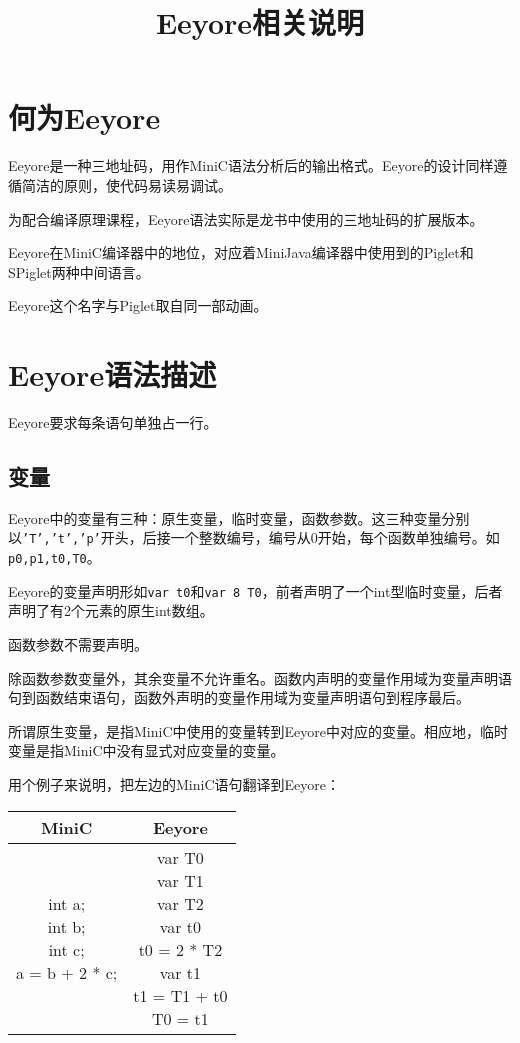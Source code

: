 \documentclass{ctexart}
\title{Eeyore相关说明}
\date{}
\author{}
\newenvironment{typewriterfont}{\ttfamily}{\par}
\begin{document}
\maketitle

\section{何为Eeyore}
Eeyore是一种三地址码，用作MiniC语法分析后的输出格式。Eeyore的设计同样遵循简洁的原则，使代码易读易调试。

为配合编译原理课程，Eeyore语法实际是龙书中使用的三地址码的扩展版本。

Eeyore在MiniC编译器中的地位，对应着MiniJava编译器中使用到的Piglet和SPiglet两种中间语言。

Eeyore这个名字与Piglet取自同一部动画。

\section{Eeyore语法描述}
Eeyore要求每条语句单独占一行。
\subsection{变量}
Eeyore中的变量有三种：原生变量，临时变量，函数参数。这三种变量分别以\texttt{'T','t','p'}开头，后接一个整数编号，编号从0开始，每个函数单独编号。如\texttt{p0,p1,t0,T0}。

Eeyore的变量声明形如\texttt{var t0}和\texttt{var 8 T0}，前者声明了一个int型临时变量，后者声明了有2个元素的原生int数组。

函数参数不需要声明。

除函数参数变量外，其余变量不允许重名。函数内声明的变量作用域为变量声明语句到函数结束语句，函数外声明的变量作用域为变量声明语句到程序最后。

所谓原生变量，是指MiniC中使用的变量转到Eeyore中对应的变量。相应地，临时变量是指MiniC中没有显式对应变量的变量。

用个例子来说明，把左边的MiniC语句翻译到Eeyore：
\begin{table}[H]
    \centering
    \small
    \begin{typewriterfont}
    \begin{tabular}{|c|c|}
        \hline
        MiniC & Eeyore \\
        \hline
        \makecell[l]{int a;\\ int b;\\ int c;\\a = b + 2 * c;} & \makecell[l]{var T0\\var T1\\var T2\\var t0\\t0 = 2 * T2\\var t1\\t1 = T1 + t0\\T0 = t1} \\
        \hline
    \end{tabular}
    \end{typewriterfont}
\end{table}
\end{document}
